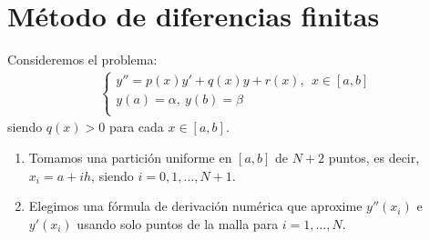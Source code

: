 \section{Método de diferencias finitas}
Consideremos el problema:
\begin{align*}
    \left\{ \begin{array}{lcc}
                y'' = p(x)y' + q(x)y + r(x), \ \ x \in [a,b] \\
                y(a) = \alpha, \ y(b) = \beta                \\
            \end{array}
    \right.
\end{align*}
siendo $q(x) > 0$ para cada $x \in [a,b]$.
\begin{enumerate}
    \item Tomamos una partición uniforme en $[a,b]$ de $N+2$ puntos, es decir, $x_i = a +ih$, siendo $i = 0,1,\ldots,N+1$.
    \item Elegimos una fórmula de derivación numérica que aproxime $y''(x_i)$ e  $y'(x_i)$ usando solo puntos de la malla para $i = 1,\ldots,N$.
\end{enumerate}

